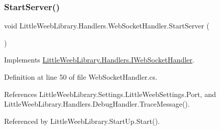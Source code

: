 \subsubsection{\texorpdfstring{Start\+Server()}{StartServer()}}
{\footnotesize\ttfamily void Little\+Weeb\+Library.\+Handlers.\+Web\+Socket\+Handler.\+Start\+Server (\begin{DoxyParamCaption}{ }\end{DoxyParamCaption})}



Implements \mbox{\hyperlink{interface_little_weeb_library_1_1_handlers_1_1_i_web_socket_handler_a14d51d50fb03c21d6f47f4250e49f288}{Little\+Weeb\+Library.\+Handlers.\+I\+Web\+Socket\+Handler}}.



Definition at line 50 of file Web\+Socket\+Handler.\+cs.



References Little\+Weeb\+Library.\+Settings.\+Little\+Weeb\+Settings.\+Port, and Little\+Weeb\+Library.\+Handlers.\+Debug\+Handler.\+Trace\+Message().



Referenced by Little\+Weeb\+Library.\+Start\+Up.\+Start().


